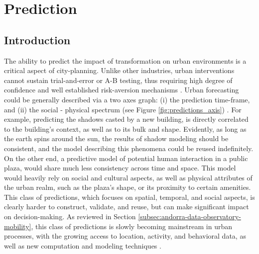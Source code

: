 \chapter{Prediction}\label{ch:prediction}

{
    \section{Introduction}
     {
      The ability to predict the impact of transformation on urban environments is a critical aspect of city-planning. Unlike other industries, urban interventions cannot sustain trial-and-error or A-B testing, thus requiring high degree of confidence and well established risk-aversion mechanisms \cite{doi:10.1080/14649357.2015.1127994, banerjee2011companion}. Urban forecasting could be generally described via a two axes graph: (i) the prediction time-frame, and (ii) the social - physical spectrum (see Figure \eqref{fig:predictions_axis})
      .\newline
      For example, predicting the shadows casted by a new building, is directly correlated to the building's context, as well as to its bulk and shape. Evidently, as long as the earth spins around the sun, the results of shadow modeling should be consistent, and the model describing this phenomena could be reused indefinitely.
      On the other end, a predictive model of potential human interaction in a public plaza, would share much less consistency across time and space. This model would heavily rely on social and cultural aspects, as well as physical attributes of the urban realm, such as the plaza's shape, or its proximity to certain amenities. This class of predictions, which focuses on spatial, temporal, and social aspects, is clearly harder to construct, validate, and reuse, but can make significant impact on decision-making. As reviewed in Section \eqref{subsec:andorra-data-observatory-mobility}, this class of predictions is slowly becoming mainstream in urban processes, with the growing access to location, activity, and behavioral data, as well as new computation and modeling techniques \cite{jiang2017activity, Calabrese2014, Batty2013, moro2021mobility}.
     }

}

